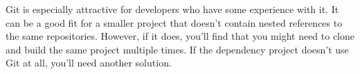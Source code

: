 Git is especially attractive for developers who have some experience with it. It can be a good fit for a smaller project that doesn't contain nested references to the same repositories. However, if it does, you'll find that you might need to clone and build the same project multiple times. If the dependency project doesn't use Git at all, you'll need another solution.



















